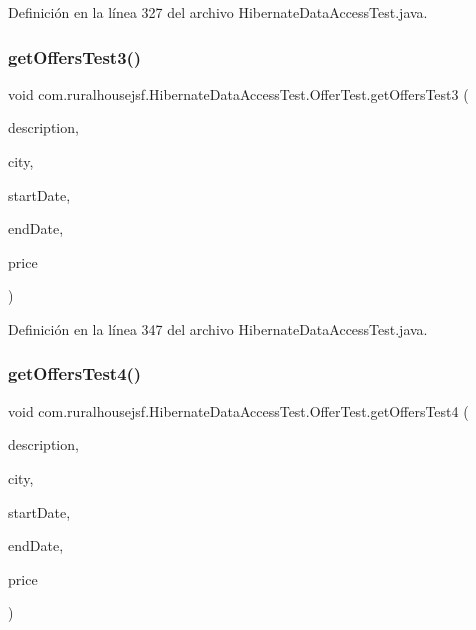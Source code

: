Definición en la línea 327 del archivo Hibernate\+Data\+Access\+Test.\+java.

\mbox{\label{a00280_ae7bee5891a0a3f569bc703193f0050a7}} 
\subsubsection{\texorpdfstring{getOffersTest3()}{getOffersTest3()}}
{\footnotesize\ttfamily void com.\+ruralhousejsf.\+Hibernate\+Data\+Access\+Test.\+Offer\+Test.\+get\+Offers\+Test3 (\begin{DoxyParamCaption}\item[{String}]{description,  }\item[{String}]{city,  }\item[{@Java\+Time\+Conversion\+Pattern(\char`\"{}dd/MM/yyyy\char`\"{}) Local\+Date}]{start\+Date,  }\item[{@Java\+Time\+Conversion\+Pattern(\char`\"{}dd/MM/yyyy\char`\"{}) Local\+Date}]{end\+Date,  }\item[{double}]{price }\end{DoxyParamCaption})\hspace{0.3cm}{\ttfamily [package]}}



Definición en la línea 347 del archivo Hibernate\+Data\+Access\+Test.\+java.

\mbox{\label{a00280_ad7d2deaa29db9f8cb13d0fbacb073223}} 
\subsubsection{\texorpdfstring{getOffersTest4()}{getOffersTest4()}}
{\footnotesize\ttfamily void com.\+ruralhousejsf.\+Hibernate\+Data\+Access\+Test.\+Offer\+Test.\+get\+Offers\+Test4 (\begin{DoxyParamCaption}\item[{String}]{description,  }\item[{String}]{city,  }\item[{@Java\+Time\+Conversion\+Pattern(\char`\"{}dd/MM/yyyy\char`\"{}) Local\+Date}]{start\+Date,  }\item[{@Java\+Time\+Conversion\+Pattern(\char`\"{}dd/MM/yyyy\char`\"{}) Local\+Date}]{end\+Date,  }\item[{double}]{price }\end{DoxyParamCaption})\hspace{0.3cm}{\ttfamily [package]}}



